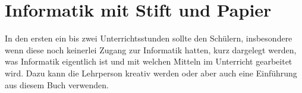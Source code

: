 \chapter {Informatik mit Stift und Papier}


In den ersten ein bis zwei Unterrichtsstunden sollte den Schülern, insbesondere wenn diese noch keinerlei Zugang zur Informatik hatten, kurz dargelegt werden, was Informatik eigentlich ist und mit welchen Mitteln im Unterricht gearbeitet wird. Dazu kann die Lehrperson kreativ werden oder aber auch eine Einführung aus diesem Buch verwenden.


